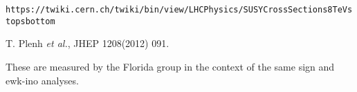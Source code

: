 \begin{thebibliography}{10}

 {\tt https://twiki.cern.ch/twiki/bin/view/LHCPhysics/SUSYCrossSections8TeVstopsbottom}

 T. Plenh {\em et al.}, JHEP 1208(2012) 091.

 These are measured by the Florida group in the context
  of the same sign and ewk-ino analyses.











    





\end{thebibliography}
